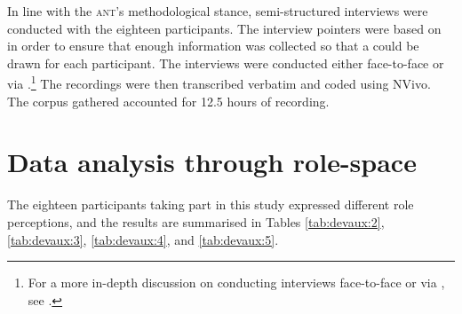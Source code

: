 \documentclass[output=paper]{langsci/langscibook}
\begin{document}
In line with the \textsc{ant}’s methodological stance, semi-structured interviews were conducted with the eighteen participants. The interview pointers were based on  in order to ensure that enough information was collected so that a  could be drawn for each participant. The interviews were conducted either face-to-face or via .{\footnote{For a more in-depth discussion on conducting interviews face-to-face or via , see \citet{Devaux2017b}.}} The recordings were then transcribed verbatim and coded using NVivo. The corpus gathered accounted for 12.5 hours of recording. 

\section{Data analysis through role-space}
\label{sec:devaux:5}
The eighteen participants taking part in this study expressed different role perceptions, and the results are summarised in Tables \ref{tab:devaux:2}, \ref{tab:devaux:3}, \ref{tab:devaux:4}, and \ref{tab:devaux:5}.

\begin{table}
\caption{Role-space in \textsc{vci a}\label{tab:devaux:2}}
\end{table}
\end{document}
